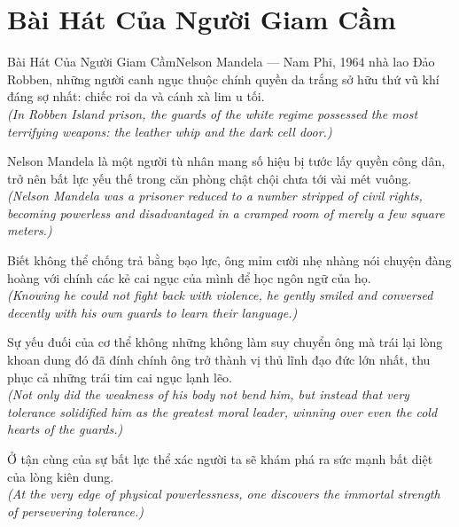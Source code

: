 \section{Bài Hát Của Người Giam Cầm}
\begin{truyen}{Bài Hát Của Người Giam Cầm}{Nelson Mandela --- Nam Phi, 1964}
 nhà lao Đảo Robben, những người canh ngục thuộc chính quyền da trắng sở hữu thứ vũ khí đáng sợ nhất: chiếc roi da và cánh xà lim u tối.\\[4pt]
\textit{(In Robben Island prison, the guards of the white regime possessed the most terrifying weapons: the leather whip and the dark cell door.)}

Nelson Mandela là một người tù nhân mang số hiệu bị tước lấy quyền công dân, trở nên bất lực yếu thế trong căn phòng chật chội chưa tới vài mét vuông.\\[4pt]
\textit{(Nelson Mandela was a prisoner reduced to a number stripped of civil rights, becoming powerless and disadvantaged in a cramped room of merely a few square meters.)}

Biết không thể chống trả bằng bạo lực, ông mỉm cười nhẹ nhàng nói chuyện đàng hoàng với chính các kẻ cai ngục của mình để học ngôn ngữ của họ.\\[4pt]
\textit{(Knowing he could not fight back with violence, he gently smiled and conversed decently with his own guards to learn their language.)}

Sự yếu đuối của cơ thể không những không làm suy chuyển ông mà trái lại lòng khoan dung đó đã đính chính ông trở thành vị thủ lĩnh đạo đức lớn nhất, thu phục cả những trái tim cai ngục lạnh lẽo.\\[4pt]
\textit{(Not only did the weakness of his body not bend him, but instead that very tolerance solidified him as the greatest moral leader, winning over even the cold hearts of the guards.)}

\end{truyen}
\begin{baihoc}
  Ở tận cùng của sự bất lực thể xác người ta sẽ khám phá ra sức mạnh bất diệt của lòng kiên dung.\\[4pt]
  \textit{(At the very edge of physical powerlessness, one discovers the immortal strength of persevering tolerance.)}
\end{baihoc}

